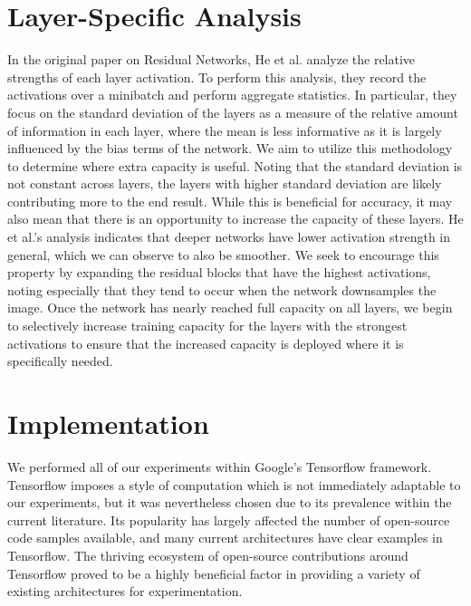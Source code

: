 \section{Layer-Specific Analysis}
In the original paper on Residual Networks, He et al. analyze the relative strengths of each layer activation.
To perform this analysis, they record the activations over a minibatch and perform aggregate statistics.
In particular, they focus on the standard deviation of the layers as a measure of the relative amount of information in each layer, where the mean is less informative as it is largely influenced by the bias terms of the network.
We aim to utilize this methodology to determine where extra capacity is useful.
Noting that the standard deviation is not constant across layers, the layers with higher standard deviation are likely contributing more to the end result.
While this is beneficial for accuracy, it may also mean that there is an opportunity to increase the capacity of these layers.
He et al.'s analysis indicates that deeper networks have lower activation strength in general, which we can observe to also be smoother.
We seek to encourage this property by expanding the residual blocks that have the highest activations, noting especially that they tend to occur when the network downsamples the image.
Once the network has nearly reached full capacity on all layers, we begin to selectively increase training capacity for the layers with the strongest activations to ensure that the increased capacity is deployed where it is specifically needed.

\section{Implementation}
We performed all of our experiments within Google's Tensorflow \cite{abadi2016tensorflow} framework.
Tensorflow imposes a style of computation which is not immediately adaptable to our experiments, but it was nevertheless chosen due to its prevalence within the current literature. 
Its popularity has largely affected the number of open-source code samples available, and many current architectures have clear examples in Tensorflow.
The thriving ecosystem of open-source contributions around Tensorflow proved to be a highly beneficial factor in providing a variety of existing architectures for experimentation.

